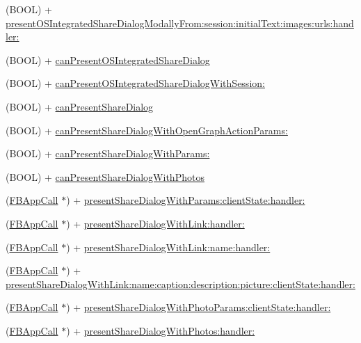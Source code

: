 \begin{DoxyCompactItemize}
\item 
(B\+O\+OL) + \hyperlink{interfaceFBDialogs_a923876e895060843c9ee0ce0836f1a7a}{present\+O\+S\+Integrated\+Share\+Dialog\+Modally\+From\+:session\+:initial\+Text\+:images\+:urls\+:handler\+:}
\item 
(B\+O\+OL) + \hyperlink{interfaceFBDialogs_a4239a93d5d1b150b93cf589bca6f46e1}{can\+Present\+O\+S\+Integrated\+Share\+Dialog}
\item 
(B\+O\+OL) + \hyperlink{interfaceFBDialogs_a268b4ee8ee491e006770a51cefa36eeb}{can\+Present\+O\+S\+Integrated\+Share\+Dialog\+With\+Session\+:}
\item 
(B\+O\+OL) + \hyperlink{interfaceFBDialogs_a017ecb9200d66140929cce227723a4d5}{can\+Present\+Share\+Dialog}
\item 
(B\+O\+OL) + \hyperlink{interfaceFBDialogs_ad8921a3906d28210cad0c0871e99f4bd}{can\+Present\+Share\+Dialog\+With\+Open\+Graph\+Action\+Params\+:}
\item 
(B\+O\+OL) + \hyperlink{interfaceFBDialogs_a36e9e390bb8c6040e6027b647ed587e8}{can\+Present\+Share\+Dialog\+With\+Params\+:}
\item 
(B\+O\+OL) + \hyperlink{interfaceFBDialogs_a16156d6a4664e4ea55e351bc78b6e8a7}{can\+Present\+Share\+Dialog\+With\+Photos}
\item 
(\hyperlink{interfaceFBAppCall}{F\+B\+App\+Call} $\ast$) + \hyperlink{interfaceFBDialogs_aea8f6d762fa50f312e7d574d27439349}{present\+Share\+Dialog\+With\+Params\+:client\+State\+:handler\+:}
\item 
(\hyperlink{interfaceFBAppCall}{F\+B\+App\+Call} $\ast$) + \hyperlink{interfaceFBDialogs_ad3172e31c558d23fd2546e482e6ad76a}{present\+Share\+Dialog\+With\+Link\+:handler\+:}
\item 
(\hyperlink{interfaceFBAppCall}{F\+B\+App\+Call} $\ast$) + \hyperlink{interfaceFBDialogs_a5f935e0fdc377b269f9cf021e242f72e}{present\+Share\+Dialog\+With\+Link\+:name\+:handler\+:}
\item 
(\hyperlink{interfaceFBAppCall}{F\+B\+App\+Call} $\ast$) + \hyperlink{interfaceFBDialogs_aaed28cb89925f451c2d8bab8f1b44e22}{present\+Share\+Dialog\+With\+Link\+:name\+:caption\+:description\+:picture\+:client\+State\+:handler\+:}
\item 
(\hyperlink{interfaceFBAppCall}{F\+B\+App\+Call} $\ast$) + \hyperlink{interfaceFBDialogs_ad8f870b0c951157f3f3c9de5f42031ae}{present\+Share\+Dialog\+With\+Photo\+Params\+:client\+State\+:handler\+:}
\item 
(\hyperlink{interfaceFBAppCall}{F\+B\+App\+Call} $\ast$) + \hyperlink{interfaceFBDialogs_aeaf0798a6057ed03c6a3cc26aa624a27}{present\+Share\+Dialog\+With\+Photos\+:handler\+:}

\end{DoxyCompactItemize}
